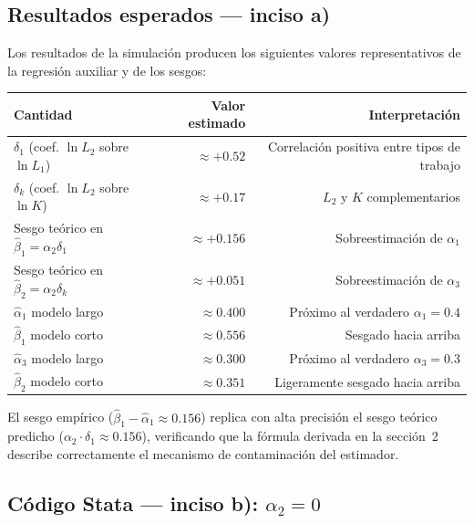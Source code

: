\documentclass[12pt, letterpaper]{article}
\begin{document}
\subsection{Resultados esperados --- inciso a)}

Los resultados de la simulación producen los siguientes valores
representativos de la regresión auxiliar y de los sesgos:

\begin{center}
\renewcommand{\arraystretch}{1.3}
\small
\begin{tabular}{lrr}
\toprule
\textbf{Cantidad} & \textbf{Valor estimado} & \textbf{Interpretación} \\
\midrule
$\delta_1$ (coef. $\ln L_2$ sobre $\ln L_1$) & $\approx +0.52$ & Correlación positiva entre tipos de trabajo \\
$\delta_k$ (coef. $\ln L_2$ sobre $\ln K$)   & $\approx +0.17$ & $L_2$ y $K$ complementarios \\
Sesgo teórico en $\hat{\beta}_1 = \alpha_2 \delta_1$ & $\approx +0.156$ & Sobreestimación de $\alpha_1$ \\
Sesgo teórico en $\hat{\beta}_2 = \alpha_2 \delta_k$ & $\approx +0.051$ & Sobreestimación de $\alpha_3$ \\
\midrule
$\hat{\alpha}_1$ modelo largo & $\approx 0.400$ & Próximo al verdadero $\alpha_1 = 0.4$ \\
$\hat{\beta}_1$ modelo corto  & $\approx 0.556$ & Sesgado hacia arriba \\
\midrule
$\hat{\alpha}_3$ modelo largo & $\approx 0.300$ & Próximo al verdadero $\alpha_3 = 0.3$ \\
$\hat{\beta}_2$ modelo corto  & $\approx 0.351$ & Ligeramente sesgado hacia arriba \\
\bottomrule
\end{tabular}
\end{center}

El sesgo empírico ($\hat{\beta}_1 - \hat{\alpha}_1 \approx 0.156$) replica
con alta precisión el sesgo teórico predicho ($\alpha_2 \cdot \delta_1
\approx 0.156$), verificando que la fórmula derivada en la sección~2
describe correctamente el mecanismo de contaminación del estimador.

\subsection{Código Stata --- inciso b): $\alpha_2 = 0$}
\end{document}

